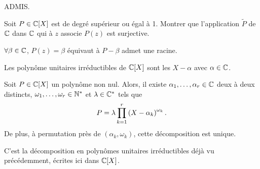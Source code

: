 \documentclass{magnolia}
\begin{document}
\begin{preuve}
ADMIS.
\end{preuve}

\begin{exoUnique}
\exo Soit $P\in\polyC$ est de degré supérieur ou égal à 1. Montrer que
  l'application
  $\tilde{P}$ de $\mathbb{C}$ dans $\mathbb{C}$ qui à $z$ associe $P(z)$ est surjective.
  \begin{sol}
  $\forall \beta \in \mathbb{C}$, $P(z)=\beta$ équivaut à $P-\beta$ admet une racine.
  \end{sol}
\end{exoUnique}

\begin{proposition}
Les polynôme unitaires irréductibles de $\polyC$ sont les $X-\alpha$ avec
$\alpha\in\mathbb{C}$.
\end{proposition}

\begin{proposition}
Soit $P\in\polyC$ un polynôme non nul. Alors, il existe
$\alpha_1,\ldots,\alpha_r\in\mathbb{C}$ deux à deux distincts,
$\omega_1,\ldots,\omega_r\in{\mathbb{N}^*}$ et $\lambda\in\mathbb{C}^*$ tels que
\[P=\lambda \prod_{k=1}^r \left(X-\alpha_k\right)^{\omega_k}.\]
De plus, à permutation près de $(\alpha_k,\omega_k)$, cette décomposition est unique.
\end{proposition}

\begin{preuve}
C'est la décomposition en polynômes unitaires irréductibles déjà vu précédemment, écrites ici dans $\polyC$.
\end{preuve}
\end{document}
